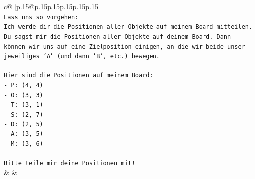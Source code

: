 \documentclass{article}
\begin{document}
{\begin{supertabular}{c@{$\;$}|p{.15\linewidth}@{}p{.15\linewidth}p{.15\linewidth}p{.15\linewidth}p{.15\linewidth}p{.15\linewidth}}
{{{\\ 
\texttt{Lass uns so vorgehen:} \\
\texttt{Ich werde dir die Positionen aller Objekte auf meinem Board mitteilen. Du sagst mir die Positionen aller Objekte auf deinem Board. Dann können wir uns auf eine Zielposition einigen, an die wir beide unser jeweiliges 'A' (und dann 'B', etc.) bewegen.} \\
\\ 
\texttt{Hier sind die Positionen auf meinem Board:} \\
\texttt{{-} P: (4, 4)} \\
\texttt{{-} O: (3, 3)} \\
\texttt{{-} T: (3, 1)} \\
\texttt{{-} S: (2, 7)} \\
\texttt{{-} D: (2, 5)} \\
\texttt{{-} A: (3, 5)} \\
\texttt{{-} M: (3, 6)} \\
\\ 
\texttt{Bitte teile mir deine Positionen mit!} \\
            }
        }
    }
    & & \\ \\


\end{supertabular}}
\end{document}
